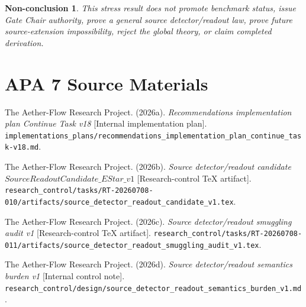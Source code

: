 \documentclass[11pt]{article}
\newtheorem{nonconclusion}{Non-conclusion}
\begin{document}
\begin{nonconclusion}
This stress result does not promote benchmark status, issue Gate Chair
authority, prove a general source detector/readout law, prove future
source-extension impossibility, reject the global theory, or claim completed
derivation.
\end{nonconclusion}

\section{APA 7 Source Materials}

The Aether-Flow Research Project. (2026a). \emph{Recommendations
implementation plan Continue Task v18} [Internal implementation plan].
\texttt{implementations\_plans/recommendations\_implementation\_plan\_continue\_task-v18.md}.

The Aether-Flow Research Project. (2026b). \emph{Source detector/readout
candidate \(SourceReadoutCandidate\_EStar\_v1\)} [Research-control TeX
artifact].
\texttt{research\_control/tasks/RT-20260708-010/artifacts/source\_detector\_readout\_candidate\_v1.tex}.

The Aether-Flow Research Project. (2026c). \emph{Source detector/readout
smuggling audit v1} [Research-control TeX artifact].
\texttt{research\_control/tasks/RT-20260708-011/artifacts/source\_detector\_readout\_smuggling\_audit\_v1.tex}.

The Aether-Flow Research Project. (2026d). \emph{Source detector/readout
semantics burden v1} [Internal control note].
\texttt{research\_control/design/source\_detector\_readout\_semantics\_burden\_v1.md}.
\end{document}
